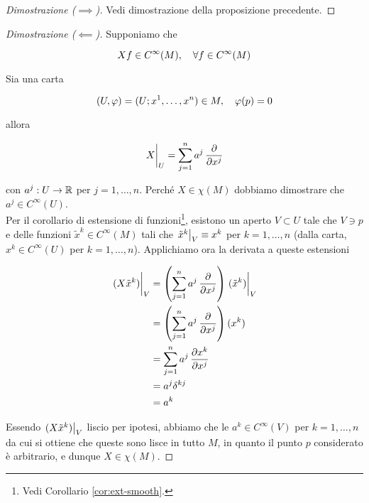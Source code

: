 \begin{proof}[Dimostrazione ($ \implies $)]
	Vedi dimostrazione della proposizione precedente.
\end{proof}

\begin{proof}[Dimostrazione ($ \impliedby $)]
	Supponiamo che
	
	\begin{equation}
		X f \in C^{\infty}(M) \qcomma \forall f \in C^{\infty}(M)
	\end{equation}

	Sia una carta
	
	\begin{equation}
		(U,\varphi) = (U; x^{1},\dots,x^{n}) \in M \qcomma \varphi(p) = 0
	\end{equation}
	
	allora
	
	\begin{equation}
		\eval{X}_{U} = \sum_{j=1}^{n} a^{j} \, \pdv{x^{j}}
	\end{equation}

	con $ a^{j} : U \to \mathbb{R} $ per $ j=1,\dots,n $. Perché $ X \in \chi(M) $ dobbiamo dimostrare che $ a^{j} \in C^{\infty}(U) $. \\
	Per il corollario di estensione di funzioni\footnote{%
		Vedi Corollario \ref{cor:ext-smooth}.%
	}, esistono un aperto $ V \subset U $ tale che $ V \ni p $ e delle funzioni $ \tilde{x}^{k} \in C^{\infty}(M) $ tali che $ \eval{\tilde{x}^{k}}_{V} \equiv x^{k} $ per $ k=1,\dots,n $ (dalla carta, $ x^{k} \in C^{\infty}(U) $ per $ k=1,\dots,n $). Applichiamo ora la derivata a queste estensioni
	
	\begin{align}
		\begin{split}
			\eval{(X \tilde{x}^{k})}_{V} &= \left( \sum_{j=1}^{n} a^{j} \, \pdv{x^{j}} \right) \eval{(\tilde{x}^{k})}_{V} \\
			&= \left( \sum_{j=1}^{n} a^{j} \, \pdv{x^{j}} \right) (x^{k}) \\
			&= \sum_{j=1}^{n} a^{j} \, \pdv{x^{k}}{x^{j}} \\
			&= a^{j} \delta^{kj} \\
			&= a^{k}
		\end{split}
	\end{align}

	Essendo $ \eval{(X \tilde{x}^{k})}_{V} $ liscio per ipotesi, abbiamo che le $ a^{k} \in C^{\infty}(V) $ per $ k=1,\dots,n $ da cui si ottiene che queste sono lisce in tutto $ M $, in quanto il punto $ p $ considerato è arbitrario, e dunque $ X \in \chi(M) $.
\end{proof}

